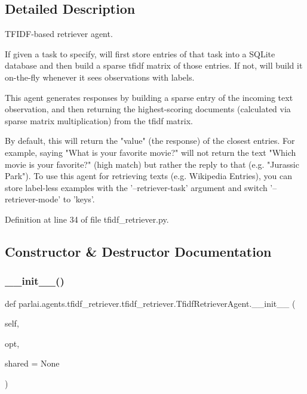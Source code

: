 \subsection{Detailed Description}
\begin{DoxyVerb}TFIDF-based retriever agent.

If given a task to specify, will first store entries of that task into
a SQLite database and then build a sparse tfidf matrix of those entries.
If not, will build it on-the-fly whenever it sees observations with labels.

This agent generates responses by building a sparse entry of the incoming
text observation, and then returning the highest-scoring documents
(calculated via sparse matrix multiplication) from the tfidf matrix.

By default, this will return the "value" (the response) of the closest
entries. For example, saying "What is your favorite movie?" will not return
the text "Which movie is your favorite?" (high match) but rather the reply
to that (e.g. "Jurassic Park"). To use this agent for retrieving texts
(e.g. Wikipedia Entries), you can store label-less examples with the
'--retriever-task' argument and switch '--retriever-mode' to 'keys'.
\end{DoxyVerb}
 

Definition at line 34 of file tfidf\+\_\+retriever.\+py.



\subsection{Constructor \& Destructor Documentation}
\mbox{\label{classparlai_1_1agents_1_1tfidf__retriever_1_1tfidf__retriever_1_1TfidfRetrieverAgent_a41828d27aad3bd78da51c74d24350f46}} 
\subsubsection{\texorpdfstring{\+\_\+\+\_\+init\+\_\+\+\_\+()}{\_\_init\_\_()}}
{\footnotesize\ttfamily def parlai.\+agents.\+tfidf\+\_\+retriever.\+tfidf\+\_\+retriever.\+Tfidf\+Retriever\+Agent.\+\_\+\+\_\+init\+\_\+\+\_\+ (\begin{DoxyParamCaption}\item[{}]{self,  }\item[{}]{opt,  }\item[{}]{shared = {\ttfamily None} }\end{DoxyParamCaption})}



